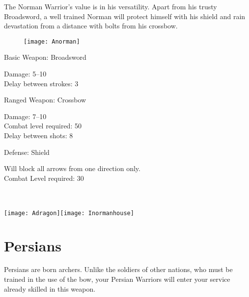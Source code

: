 
The Norman Warrior’s value is in his versatility. Apart from his trusty Broadsword, a well trained Norman will protect himself with his shield and rain devastation from a distance with bolts from his crossbow.

\begin{wrapfigure}{r}{0.5\textwidth}
	\begin{center}
		\vspace{-20pt}
		\texttt{[image: Anorman]}
	\end{center}
	\vspace{-20pt}
\end{wrapfigure}

Basic Weapon: Broadsword
\begin{adjustwidth}{1cm}{}
	Damage: 5–10 \\
	Delay between strokes: 3
\end{adjustwidth}
Ranged Weapon: Crossbow
\begin{adjustwidth}{1cm}{}
	Damage: 7–10 \\
	Combat level required: 50 \\
	Delay between shots: 8
\end{adjustwidth}
Defense: Shield
\begin{adjustwidth}{1cm}{}
	Will block all arrows from one direction only. \\
	Combat Level required: 30 \\ \\ \\
\end{adjustwidth}

\begin{center}
	\texttt{[image: Adragon]}\hspace{1pt}\texttt{[image: Inormanhouse]}
\end{center}

\clearpage

\section{Persians}


Persians are born archers. Unlike the soldiers of other nations, who must be trained in the use of the bow, your Persian Warriors will enter your service already skilled in this weapon.

